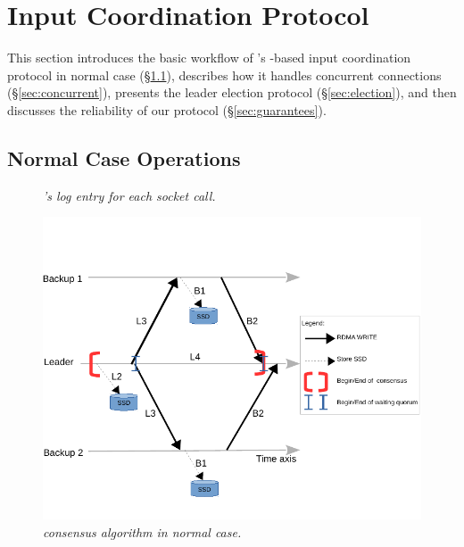 \section{Input Coordination Protocol} \label{sec:input}

This section introduces the basic workflow of \xxx's \paxos-based input 
coordination protocol in normal case (\S\ref{sec:normal}), describes how it 
handles concurrent connections (\S\ref{sec:concurrent}), presents the leader 
election protocol (\S\ref{sec:election}), and then discusses the reliability 
of our protocol (\S\ref{sec:guarantees}).

\subsection{Normal Case Operations} \label{sec:normal}

\begin{figure}[t]
\centering
\begin{minipage}{.5\textwidth}
\end{minipage}
\vspace{-.1in}
\caption{{\em \xxx's log entry for each socket call.}} \label{fig:logentry}
\vspace{-.05in}
\end{figure}

\begin{figure}[t]
\centering
\vspace{-0.15in}
\includegraphics[width=.5\textwidth]{figures/consensus}
\vspace{-.4in}
\caption{{\em \xxx consensus algorithm in normal case.}} \label{fig:consensus}
\vspace{-.05in}
\end{figure}


